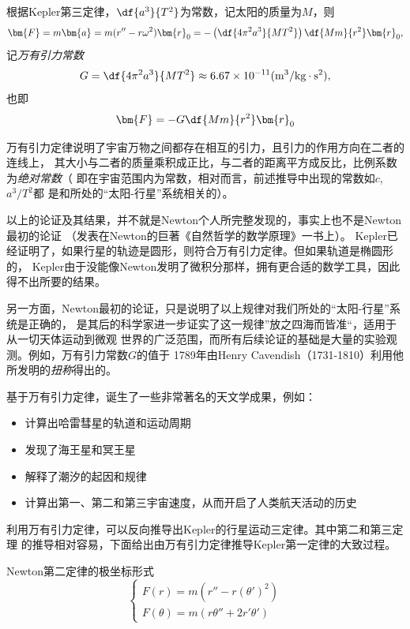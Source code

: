 \begin{shaded}
	根据Kepler第三定律，$\df{a^3}{T^2}$为常数，记太阳的质量为$M$，则
	$$\bm{F}=m\bm{a}=m(r''-r\omega^2)\bm{r}_0
	=-\left(\df{4\pi^2a^3}{MT^2}\right)\df{Mm}{r^2}\bm{r}_0,$$
	记{\it 万有引力常数}
	$$G=\df{4\pi^2a^3}{MT^2}\approx 6.67\times 10^{-11}
	(\mbox{m}^3/\mbox{kg}\cdot\mbox{s}^2),
	$$
	也即
	$$\bm{F}=-G\df{Mm}{r^2}\bm{r}_0$$
	
	
	万有引力定律说明了宇宙万物之间都存在相互的引力，且引力的作用方向在二者的连线上，
	其大小与二者的质量乘积成正比，与二者的距离平方成反比，比例系数为{\it 绝对常数}（
	即在宇宙范围内为常数，相对而言，前述推导中出现的常数如$c$,$a^3/T^2$都
	是和所处的“太阳-行星”系统相关的）。
	
	
	以上的论证及其结果，并不就是Newton个人所完整发现的，事实上也不是Newton最初的论证
	（发表在Newton的巨著《自然哲学的数学原理》一书上）。
	Kepler已经证明了，如果行星的轨迹是圆形，则符合万有引力定律。但如果轨道是椭圆形的，
	Kepler由于没能像Newton发明了微积分那样，拥有更合适的数学工具，因此得不出所要的结果。
	
	另一方面，Newton最初的论证，只是说明了以上规律对我们所处的“太阳-行星”系统是正确的，
	是其后的科学家进一步证实了这一规律”放之四海而皆准“，适用于从一切天体运动到微观
	世界的广泛范围，而所有后续论证的基础是大量的实验观测。例如，万有引力常数$G$的值于
	1789年由Henry Cavendish（1731-1810）利用他所发明的{\it 扭称}得出的。
	
	基于万有引力定律，诞生了一些非常著名的天文学成果，例如：
	
	\begin{itemize}
	  \item 计算出哈雷彗星的轨道和运动周期
	  \item 发现了海王星和冥王星
	  \item 解释了潮汐的起因和规律
	  \item 计算出第一、第二和第三宇宙速度，从而开启了人类航天活动的历史
	\end{itemize}
	
	利用万有引力定律，可以反向推导出Kepler的行星运动三定律。其中第二和第三定理
	的推导相对容易，下面给出由万有引力定律推导Kepler第一定律的大致过程。
	
	Newton第二定律的极坐标形式
	$$
	\left\{\begin{array}{l}
		F(r)=m(r''-r(\theta')^2)\\
		F(\theta)=m(r\theta''+2r'\theta')
	\end{array}\right.
	$$
	

\end{shaded}
